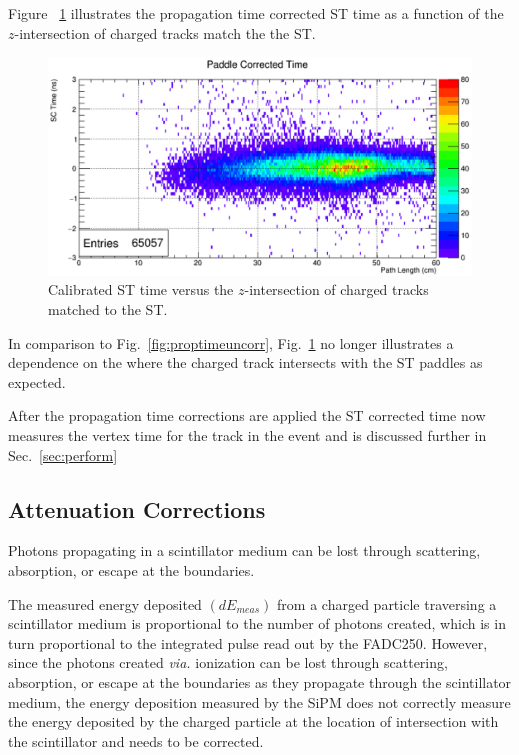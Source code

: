 {Figure ~\ref{fig:proptimecorr} illustrates the propagation time corrected ST time as a function of the $z$-intersection of charged tracks match the the ST.
\begin{figure}[!htb]
	\centering
	\includegraphics[width=1.0\columnwidth]{performance/figs/prop_time_corr}
	\caption{Calibrated ST time versus the $z$-intersection of charged tracks matched to the ST.}
	\label{fig:proptimecorr}
\end{figure}
In comparison to Fig.~\ref{fig:proptimeuncorr}, Fig.~\ref{fig:proptimecorr} no longer illustrates a dependence on the where the charged track intersects with the ST paddles as expected.
	
After the propagation time corrections are applied the ST corrected time now measures the vertex time for the track in the event and is discussed further in Sec.~\ref{sec:perform}


\subsection{Attenuation Corrections} \label{sec:calib_ac}

Photons propagating in a scintillator medium  can be lost through scattering, absorption, or escape at the boundaries.  

The measured energy deposited $(dE_{meas})$ from a charged particle traversing a scintillator medium is proportional to the number of photons created, which is in turn proportional to the integrated pulse read out by the FADC250. 
 However, since the photons created \textit{via.} ionization can be lost through scattering, absorption, or escape at the boundaries as they propagate through the scintillator medium, the energy deposition measured by the SiPM does not correctly measure the energy deposited by the charged particle at the location of intersection with the scintillator and needs to be corrected.  


}
